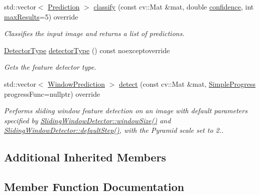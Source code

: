 \begin{DoxyCompactItemize}
std\+::vector$<$ \hyperlink{structdg_1_1deepcore_1_1classification_1_1_prediction}{Prediction} $>$ \hyperlink{classdg_1_1deepcore_1_1classification_1_1_sliding_window_detector_ad68cd98a39fdab57c9de0ad0e3153f45}{classify} (const cv\+::\+Mat \&mat, double \hyperlink{group___classification_module_ga11004d28f6b88023d1ae1bed44261dc9}{confidence}, int \hyperlink{group___classification_module_gae2a1d191924996f7d3d0673b8c2da35d}{max\+Results}=5) override
\begin{DoxyCompactList}\small\item\em Classifies the input image and returns a list of predictions. \end{DoxyCompactList}\item 
\hyperlink{group___classification_module_ga9fa0b4fe3495e513c3c0746aa0940f41}{Detector\+Type} \hyperlink{classdg_1_1deepcore_1_1classification_1_1_sliding_window_detector_a0897f20b003a4e70066e1cd69ea98c66}{detector\+Type} () const noexceptoverride
\begin{DoxyCompactList}\small\item\em Gets the feature detector type. \end{DoxyCompactList}\item 
std\+::vector$<$ \hyperlink{structdg_1_1deepcore_1_1classification_1_1_window_prediction}{Window\+Prediction} $>$ \hyperlink{group___classification_module_gaf9e9535cf11f5961389a5271248062cb}{detect} (const cv\+::\+Mat \&mat, \hyperlink{group___utility_module_ga6763018df79e4bdbcd8cd14cea5342b2}{Simple\+Progress} progress\+Func=nullptr) override
\begin{DoxyCompactList}\small\item\em Performs sliding window feature detection on an image with default parameters specified by \hyperlink{group___classification_module_ga35c268eb743bfbfb5d77d30ddbcc48e5}{Sliding\+Window\+Detector\+::window\+Size()} and \hyperlink{group___classification_module_ga8e430c585fe3d3bcba00c21f418752d2}{Sliding\+Window\+Detector\+::default\+Step()}, with the Pyramid scale set to 2.. \end{DoxyCompactList}\end{DoxyCompactItemize}
\subsection*{Additional Inherited Members}


\subsection{Member Function Documentation}
